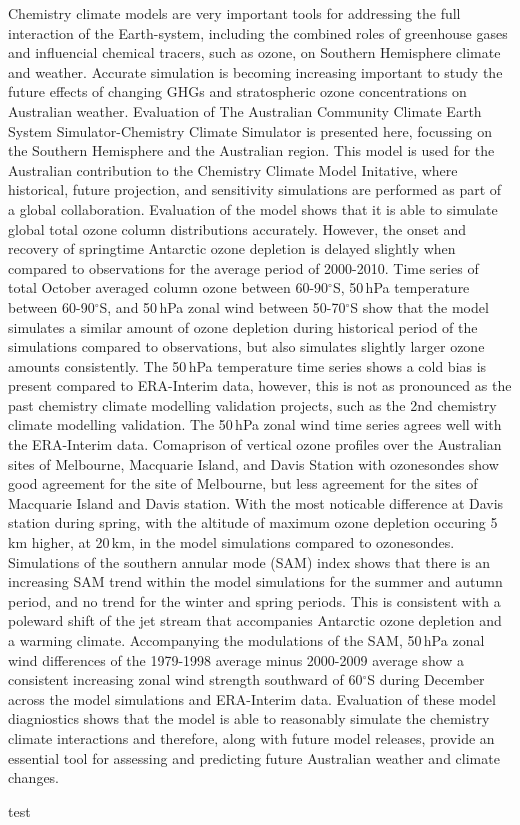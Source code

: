Chemistry climate models are very important tools for addressing the full interaction of the Earth-system, including the combined roles of greenhouse gases and influencial chemical tracers, such as ozone, on Southern Hemisphere climate and weather. Accurate simulation is becoming increasing important to study the future effects of changing GHGs and stratospheric ozone concentrations on Australian weather. Evaluation of The Australian Community Climate Earth System Simulator-Chemistry Climate Simulator is presented here, focussing on the Southern Hemisphere and the Australian region. This model is used for the Australian contribution to the Chemistry Climate Model Initative, where historical, future projection, and sensitivity simulations are performed as part of a global collaboration. Evaluation of the model shows that it is able to simulate global total ozone column distributions accurately. However, the onset and recovery of springtime Antarctic ozone depletion is delayed slightly when compared to observations for the average period of 2000-2010. Time series of total October averaged column ozone between 60-90$^\circ$S, 50\,hPa temperature between 60-90$^\circ$S, and 50\,hPa zonal wind between 50-70$^\circ$S show that the model simulates a similar amount of ozone depletion during historical period of the simulations compared to observations, but also simulates slightly larger ozone amounts consistently. The 50\,hPa temperature time series shows a cold bias is present compared to ERA-Interim data, however, this is not as pronounced as the past chemistry climate modelling validation projects, such as the 2nd chemistry climate modelling validation. The 50\,hPa zonal wind time series agrees well with the ERA-Interim data. Comaprison of vertical ozone profiles over the Australian sites of Melbourne, Macquarie Island, and Davis Station with ozonesondes show good agreement for the site of Melbourne, but less agreement for the sites of Macquarie Island and Davis station. With the most noticable difference at Davis station during spring, with the altitude of maximum ozone depletion occuring 5\,km higher, at 20\,km, in the model simulations compared to ozonesondes. Simulations of the southern annular mode (SAM) index shows that there is an increasing SAM trend within the model simulations for the summer and autumn period, and no trend for the winter and spring periods. This is consistent with a poleward shift of the jet stream that accompanies Antarctic ozone depletion and a warming climate. Accompanying the modulations of the SAM, 50\,hPa zonal wind differences of the 1979-1998 average minus 2000-2009 average show a consistent increasing zonal wind strength southward of 60$^\circ$S during December across the model simulations and ERA-Interim data. Evaluation of these model diagniostics shows that the model is able to reasonably simulate the chemistry climate interactions and therefore, along with future model releases, provide an essential tool for assessing and predicting future Australian weather and climate changes.

test
